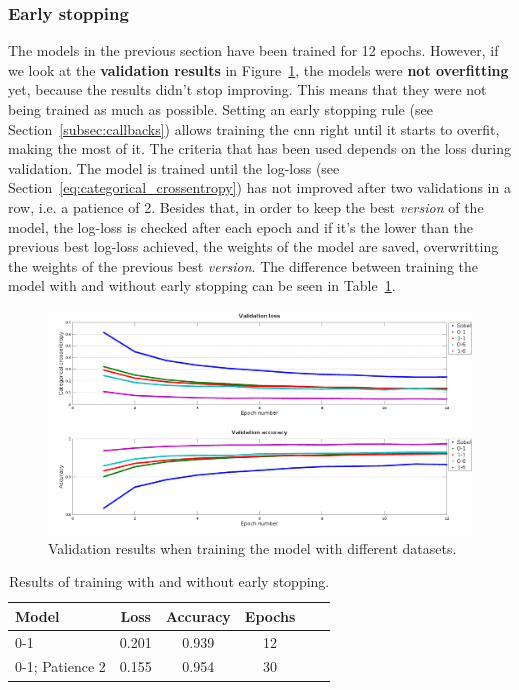 \subsubsection{Early stopping}
The models in the previous section have been trained for 12 epochs. However, if we look at the \textbf{validation results} in Figure~\ref{fig:val_datasets}, the models were \textbf{not overfitting} yet, because the results didn't stop improving. This means that they were not being trained as much as possible. Setting an early stopping rule (see Section~\ref{subsec:callbacks}) allows training the \gls{cnn} right until it starts to overfit, making the most of it. The criteria that has been used depends on the loss during validation. The model is trained until the log-loss (see Section~\ref{eq:categorical_crossentropy}) has not improved after two validations in a row, i.e. a patience of 2. Besides that, in order to keep the best \textit{version} of the model, the log-loss is checked after each epoch and if it's the lower than the previous best log-loss achieved, the weights of the model are saved, overwritting the weights of the previous best \textit{version}. The difference between training the model with and without early stopping can be seen in Table~\ref{tbl:earlystopping}.
\begin{figure}
	\centering
	\includegraphics[width=1\linewidth, keepaspectratio]{figures/val_datasets.png}
	\caption{Validation results when training the model with different datasets.}
	\label{fig:val_datasets}
\end{figure}

\begin{table}
	\centering
	\begin{tabular}{l*{4}{c}r}
		\textbf{Model} & \textbf{Loss} & \textbf{Accuracy} & \textbf{Epochs} \\
		\hline
		0-1 & 0.201 & 0.939 & 12 \\
		0-1; Patience 2 & 0.155 & 0.954 & 30 \\
	\end{tabular}
	\caption{Results of training with and without early stopping.}
	\label{tbl:earlystopping}
\end{table}

